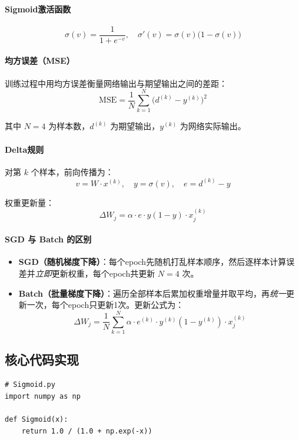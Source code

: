 \documentclass[10.5pt]{config}
\begin{document}
\paragraph{Sigmoid激活函数}

$$\sigma(v) = \frac{1}{1 + e^{-v}}, \quad \sigma'(v) = \sigma(v)\bigl(1 - \sigma(v)\bigr)$$

\paragraph{均方误差（MSE）}

训练过程中用均方误差衡量网络输出与期望输出之间的差距：
$$\text{MSE} = \frac{1}{N}\sum_{k=1}^{N}\bigl(d^{(k)} - y^{(k)}\bigr)^2$$

其中 $N=4$ 为样本数，$d^{(k)}$ 为期望输出，$y^{(k)}$ 为网络实际输出。

\paragraph{Delta规则}

对第 $k$ 个样本，前向传播为：
$$v = W \cdot x^{(k)}, \quad y = \sigma(v), \quad e = d^{(k)} - y$$

权重更新量：
$$\Delta W_j = \alpha \cdot e \cdot y(1-y) \cdot x_j^{(k)}$$

\paragraph{SGD 与 Batch 的区别}

\begin{itemize}
    \item \textbf{SGD（随机梯度下降）}：每个epoch先随机打乱样本顺序，然后逐样本计算误差并\emph{立即}更新权重，每个epoch共更新 $N=4$ 次。
    \item \textbf{Batch（批量梯度下降）}：遍历全部样本后累加权重增量并取平均，再\emph{统一}更新一次，每个epoch只更新1次。更新公式为：
    $$\Delta W_{j} = \frac{1}{N}\sum_{k=1}^{N} \alpha \cdot e^{(k)} \cdot y^{(k)}(1-y^{(k)}) \cdot x_j^{(k)}$$
\end{itemize}

\subsection{核心代码实现}

\begin{listing}[H]
\begin{verbatim}
# Sigmoid.py
import numpy as np

def Sigmoid(x):
    return 1.0 / (1.0 + np.exp(-x))
\end{verbatim}
\caption{Step 1——Sigmoid激活函数定义}
\end{listing}
\end{document}
